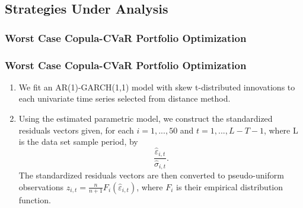 \documentclass[pdf,10pt,xcolor=dvipsnames,hide notes]{beamer}
\begin{document}
%	
%			
%			
%			
%			
%			
%			
%			
%		
%	

\subsection{Strategies Under Analysis}

\subsubsection{Worst Case Copula-CVaR Portfolio Optimization}
\begin{frame}[label=frame5]
\frametitle{Worst Case Copula-CVaR Portfolio Optimization}

\begin{enumerate}
	\setcounter{enumi}{0}
\justifying
\item We fit an AR(1)-GARCH(1,1) model with skew t-distributed
innovations to each univariate time series selected from distance method.

\vspace{0.3cm}

\item Using the estimated parametric model, we construct the standardized
residuals vectors given, for each $i=1,...,50$ and $t=1,...,L-T-1$, where L is the data set sample period, by
\begin{equation*}
\frac{\widehat{\varepsilon }_{i,t}}{\widehat{\sigma }_{i,t}}.
\end{equation*}%
The standardized residuals vectors are then converted to pseudo-uniform
observations $z_{i,t}=\frac{n}{n+1}F_{i}\left( \widehat{\varepsilon }%
_{i,t}\right) $, where $F_{i}$ is their empirical distribution function.

 
 \end{enumerate}

\end{frame}
\end{document}
